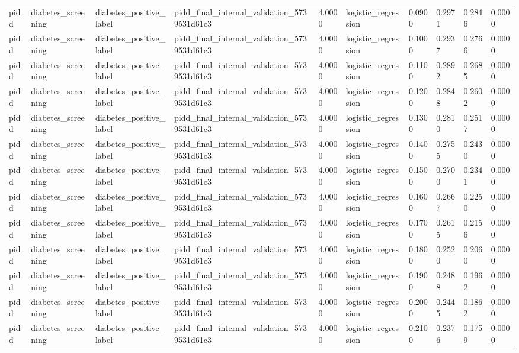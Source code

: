 \begin{tabular}{llllllllll}
pidd & diabetes\_screening & diabetes\_positive\_label & pidd\_final\_internal\_validation\_5739531d61c3 & 4.0000 & logistic\_regression & 0.0900 & 0.2971 & 0.2846 & 0.0000 \\
pidd & diabetes\_screening & diabetes\_positive\_label & pidd\_final\_internal\_validation\_5739531d61c3 & 4.0000 & logistic\_regression & 0.1000 & 0.2937 & 0.2766 & 0.0000 \\
pidd & diabetes\_screening & diabetes\_positive\_label & pidd\_final\_internal\_validation\_5739531d61c3 & 4.0000 & logistic\_regression & 0.1100 & 0.2892 & 0.2685 & 0.0000 \\
pidd & diabetes\_screening & diabetes\_positive\_label & pidd\_final\_internal\_validation\_5739531d61c3 & 4.0000 & logistic\_regression & 0.1200 & 0.2848 & 0.2602 & 0.0000 \\
pidd & diabetes\_screening & diabetes\_positive\_label & pidd\_final\_internal\_validation\_5739531d61c3 & 4.0000 & logistic\_regression & 0.1300 & 0.2810 & 0.2517 & 0.0000 \\
pidd & diabetes\_screening & diabetes\_positive\_label & pidd\_final\_internal\_validation\_5739531d61c3 & 4.0000 & logistic\_regression & 0.1400 & 0.2755 & 0.2430 & 0.0000 \\
pidd & diabetes\_screening & diabetes\_positive\_label & pidd\_final\_internal\_validation\_5739531d61c3 & 4.0000 & logistic\_regression & 0.1500 & 0.2700 & 0.2341 & 0.0000 \\
pidd & diabetes\_screening & diabetes\_positive\_label & pidd\_final\_internal\_validation\_5739531d61c3 & 4.0000 & logistic\_regression & 0.1600 & 0.2667 & 0.2250 & 0.0000 \\
pidd & diabetes\_screening & diabetes\_positive\_label & pidd\_final\_internal\_validation\_5739531d61c3 & 4.0000 & logistic\_regression & 0.1700 & 0.2615 & 0.2156 & 0.0000 \\
pidd & diabetes\_screening & diabetes\_positive\_label & pidd\_final\_internal\_validation\_5739531d61c3 & 4.0000 & logistic\_regression & 0.1800 & 0.2520 & 0.2060 & 0.0000 \\
pidd & diabetes\_screening & diabetes\_positive\_label & pidd\_final\_internal\_validation\_5739531d61c3 & 4.0000 & logistic\_regression & 0.1900 & 0.2488 & 0.1962 & 0.0000 \\
pidd & diabetes\_screening & diabetes\_positive\_label & pidd\_final\_internal\_validation\_5739531d61c3 & 4.0000 & logistic\_regression & 0.2000 & 0.2445 & 0.1862 & 0.0000 \\
pidd & diabetes\_screening & diabetes\_positive\_label & pidd\_final\_internal\_validation\_5739531d61c3 & 4.0000 & logistic\_regression & 0.2100 & 0.2376 & 0.1759 & 0.0000 \\

\end{tabular}
